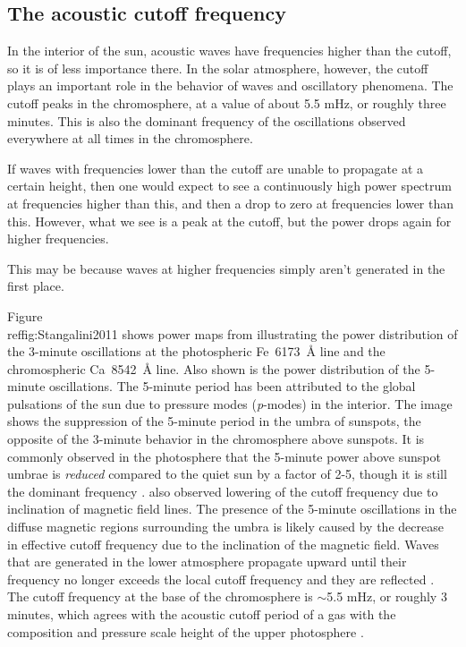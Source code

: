 \subsection{The acoustic cutoff frequency}
In the interior of the sun, acoustic waves have frequencies higher than the
cutoff, so it is of less importance there. In the solar atmosphere, however,
the cutoff plays an important role in the behavior of waves and oscillatory
phenomena.
The cutoff peaks in the chromosphere, at a value of about 5.5 mHz,
or roughly three minutes. This is also the dominant frequency of the
oscillations observed everywhere at all times in the chromosphere.

If waves with frequencies lower than the cutoff are unable to propagate
at a certain height, then one would expect to see a continuously high power
spectrum at frequencies higher than this, and then a drop to zero at
frequencies lower than this. However, what we see is a peak at the cutoff,
but the power drops again for higher frequencies.


This may be because waves at higher frequencies simply aren't generated
in the first place.



Figure~\\ref{fig:Stangalini2011} shows power maps from
\cite{Stangalini2011} illustrating the power distribution of the
3-minute oscillations at the photospheric Fe~6173~\AA{} line and the
chromospheric Ca~8542~\AA{} line. Also shown is the power distribution
of the 5-minute oscillations. The 5-minute period has been attributed
to the global pulsations of the sun due to pressure modes
(\textit{p}-modes) in the interior. The image shows the suppression of
the 5-minute period in the umbra of sunspots, the opposite of the
3-minute behavior in the chromosphere above sunspots. It is commonly
observed in the photosphere that the 5-minute power above sunspot
umbrae is \emph{reduced} compared to the quiet sun by a factor of 2-5,
though it is still the dominant frequency
\citep{Felipe2010, Bogdan2006}.
\cite{Reznikova2012} also observed lowering of the cutoff frequency
due to inclination of magnetic field lines.
The presence of the 5-minute oscillations in the diffuse magnetic regions
surrounding the umbra is likely caused by the decrease in effective
cutoff frequency due to the inclination of the magnetic field. Waves
that are generated in the lower atmosphere propagate upward until
their frequency no longer exceeds the local cutoff frequency and they
are reflected \citep{DeMoortel2000, Brynildsen1999}. The cutoff
frequency at the base of the chromosphere is $\sim$5.5 mHz, or roughly
3 minutes, which agrees with the acoustic cutoff period of a gas with
the composition and pressure scale height of the upper photosphere
\citep{Kalkofen1994}.

